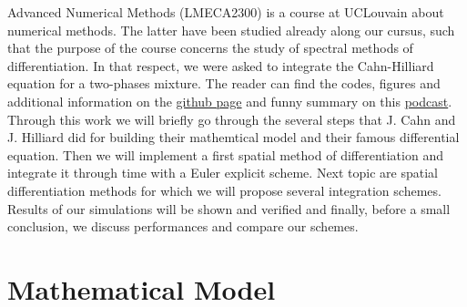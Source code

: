 \documentclass[10pt,a4paper,twocolumn]{article}
\begin{document}
Advanced Numerical Methods (LMECA2300) is a course at UCLouvain about numerical methods. The latter have been studied already along our cursus, such that the purpose of the course concerns the study of spectral methods of differentiation. In that respect, we were asked to integrate the Cahn-Hilliard equation for a two-phases mixture. The reader can find the codes, figures and additional information on the \href{https://github.com/InspBarn/lmeca2300/tree/main/project}{github page} and funny summary on this \href{https://www.youtube.com/watch?v=8SUhwZYsc1o}{podcast}.
\vspace{\baselineskip}\\
Through this work we will briefly go through the several steps that J. Cahn and J. Hilliard did for building their mathemtical model and their famous differential equation. Then we will implement a first spatial method of differentiation and integrate it through time with a Euler explicit scheme. Next topic are spatial differentiation methods for which we will propose several integration schemes. Results of our simulations will be shown and verified and finally, before a small conclusion, we discuss performances and compare our schemes.

\section{Mathematical Model} %
\label{sec:mathematical_model}
\end{document}
